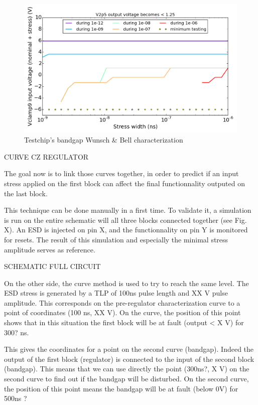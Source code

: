 \begin{figure}[!htbp]
  \centering
  \includegraphics[width=\textwidth]{src/4/figures/cz_bandgap.png}
  \caption{Testchip's bandgap Wunsch & Bell characterization}
  \label{bandgap_wb}
\end{figure}


CURVE CZ REGULATOR

The goal now is to link those curves together, in order to predict if an input
stress applied on the first block can affect the final functionnality outputed
on the last block.

This technique can be done manually in a first time. To validate it,
a simulation is run on the entire schematic will all three blocks
connected together (see Fig. X).
An ESD is injected on pin X, and the functionnality on pin Y is monitored for resets.
The result of this simulation and especially the minimal stress amplitude serves as reference.

SCHEMATIC FULL CIRCUIT

On the other side, the curve method is used to try to reach the same level.
The ESD stress is generated by a TLP of 100ns pulse length and XX V pulse amplitude.
This corresponds on the pre-regulator characterization curve to a point of coordinates (100 ns, XX V).
On the curve, the position of this point shows that in this situation the first block will be at fault (output < X V) for 300? ns.

This gives the coordinates for a point on the second curve (bandgap).
Indeed the output of the first block (regulator) is connected to the input of the second block (bandgap).
This means that we can use directly the point (300ns?, X V) on the second curve to find out if the bandgap will be disturbed.
On the second curve, the position of this point means the bandgap will be at fault (below 0V) for 500ns ?

